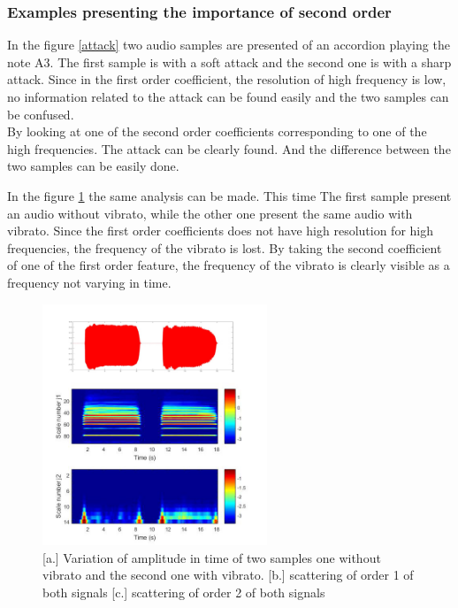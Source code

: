 \documentclass[hidelinks,12pt]{report}
\begin{document}
\subsubsection{Examples presenting the importance of second order}
In the figure \ref{attack} two audio samples are presented of an accordion playing the note A3. The first sample is with a soft attack and the second one is with a sharp attack. Since in the first order coefficient, the resolution of high frequency is low, no information related to the attack can be found easily and the two samples can be confused. \\
By looking at one of the second order coefficients corresponding to one of the high frequencies. The attack can be clearly found. And the difference between the two samples can be easily done.\par
In the figure \ref{vib} the same analysis can  be made. This time The first sample present an audio without vibrato, while the other one present the same audio with vibrato. Since the first order coefficients does not have high resolution for high frequencies, the frequency of the vibrato is lost. By taking the second coefficient of one of the first order feature, the frequency of the vibrato is clearly visible as a frequency not varying in time.
\begin{figure}[t!]
  
  \centering
	    \includegraphics[width=0.6\textwidth]{vib}
    \caption{[a.] Variation of amplitude in time of two samples one without vibrato and the second one with vibrato. [b.] scattering of order 1 of both signals [c.] scattering of order 2 of both signals }
    \label{vib}
\end{figure}
\end{document}
